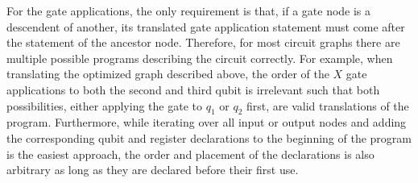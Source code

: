 For the gate applications, the only requirement is that, if a gate node is a descendent of another, its translated gate application statement must come after the statement of the ancestor node. Therefore, for most circuit graphs there are multiple possible programs describing the circuit correctly. For example, when translating the optimized graph described above, the order of the $X$ gate applications to both the second and third qubit is irrelevant such that both possibilities, \ie either applying the gate to $q_1$ or $q_2$ first, are valid translations of the program. Furthermore, while iterating over all input or output nodes and adding the corresponding qubit and register declarations to the beginning of the program is the easiest approach, the order and placement of the declarations is also arbitrary as long as they are declared before their first use. 

